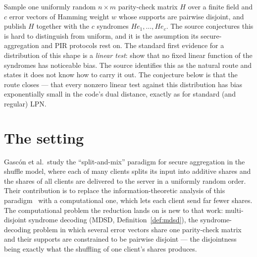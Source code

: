 \documentclass{aicr-conjecture}
\begin{document}

\vspace{0.4em}

\begin{informalconjecture}
Sample one uniformly random $n \times m$ parity-check matrix $H$ over a
finite field and $c$ error vectors of Hamming weight $w$ whose supports
are pairwise disjoint, and publish $H$ together with the $c$ syndromes
$H e_{1}, \dots, H e_{c}$. The source conjectures this is hard to
distinguish from uniform, and it is the assumption its secure-aggregation
and PIR protocols rest on. The standard first evidence for a
distribution of this shape is a \emph{linear test}: show that no fixed
linear function of the syndromes has noticeable bias. The source
identifies this as the natural route and states it does not know how to
carry it out. The conjecture below is that the route closes --- that
every nonzero linear test against this distribution has bias
exponentially small in the code's dual distance, exactly as for standard
(and regular) LPN\@.
\end{informalconjecture}

\section{The setting}\label{sec:setting}

Gasc\'on et al.\ study the ``split-and-mix'' paradigm for secure
aggregation in the shuffle model, where each of many clients splits its
input into additive shares and the shares of all clients are delivered
to the server in a uniformly random order. Their contribution is to
replace the information-theoretic analysis of this
paradigm~\cite{IKOS06,BBGN20,GMPV20} with a computational one, which
lets each client send far fewer shares. The computational problem the
reduction lands on is new to that work: multi-disjoint syndrome decoding
(MDSD, Definition~\ref{def:mdsd}), the syndrome-decoding problem in
which several error vectors share one parity-check matrix and their
supports are constrained to be pairwise disjoint --- the disjointness
being exactly what the shuffling of one client's shares produces.
\end{document}
